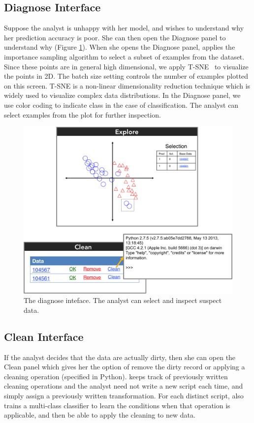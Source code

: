 \subsection{Diagnose Interface}
Suppose the analyst is unhappy with her model, and wishes to understand why her prediction accuracy is poor.
She can then open the \textsf{Diagnose} panel to understand why (Figure \ref{diag}).
When she opens the \textsf{Diagnose} panel, \sys applies the importance sampling algorithm to select a subset of examples from the dataset.
Since these points are in general high dimensional, we apply T-SNE~\cite{van2008visualizing} to visualize the points in 2D.
The batch size setting controls the number of examples plotted on this screen.
T-SNE is a non-linear dimensionality reduction technique which is widely used to visualize complex data distributions.
In the \textsf{Diagnose} panel, we use color coding to indicate class in the case of classification.
The analyst can select examples from the plot for further inspection.

\begin{figure}[t]
\centering
 \includegraphics[width=0.6\columnwidth]{figs/interface3.png}
 \caption{The diagnose inteface. The analyst can select and inspect suspect data. \label{diag}}
\end{figure}

\subsection{Clean Interface}
If the analyst decides that the data are actually dirty, then she can open the \textsf{Clean} panel which gives her the option of remove the dirty record or applying a cleaning operation (specified in Python).
\sys keeps track of previously written cleaning operations and the analyst need not write a new script each time, and simply assign a previously written transformation. 
For each distinct script, \sys also trains a multi-class classifier to learn the conditions when that operation is applicable, and then be able to apply the cleaning to new data.

